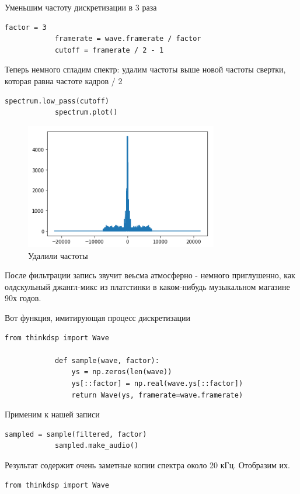 \documentclass[a4paper,12pt]{article}
\begin{document}
\begin{enumerate}
		Уменьшим частоту дискретизации в 3 раза
		\begin{lstlisting}[caption=Уменьшаем частоту дискретизации]
			factor = 3
			framerate = wave.framerate / factor
			cutoff = framerate / 2 - 1
		\end{lstlisting}
		
		Теперь немного сгладим спектр: удалим частоты выше новой частоты свертки, которая равна частоте кадров / 2
		\begin{lstlisting}[caption=Сглаживаем]
			spectrum.low_pass(cutoff)
			spectrum.plot()
		\end{lstlisting}
		\begin{figure}[H]
			\centering
			\includegraphics[width=0.75\textwidth]{3_3.png}
			\caption{Удалили частоты}
			\label{fig:3.3}
		\end{figure}
	
		После фильтрации запись звучит веьсма атмосферно - немного приглушенно, как олдскульный джангл-микс из платстинки в каком-нибудь музыкальном магазине 90х годов.
		
		Вот функция, имитирующая процесс дискретизации
		\begin{lstlisting}[caption=Функция \texttt{sample()}]
			from thinkdsp import Wave
			
			def sample(wave, factor):
				ys = np.zeros(len(wave))
				ys[::factor] = np.real(wave.ys[::factor])
				return Wave(ys, framerate=wave.framerate) 
		\end{lstlisting}
		
		Применим к нашей записи
		\begin{lstlisting}[caption=Применяем \texttt{sample()}]
			sampled = sample(filtered, factor)
			sampled.make_audio()
		\end{lstlisting}
		
		Результат содержит очень заметные копии спектра около 20 кГц. Отобразим их.
		\begin{lstlisting}[caption=Отображаем результат]
			from thinkdsp import Wave
			

\end{lstlisting}
\end{enumerate}
\end{document}
